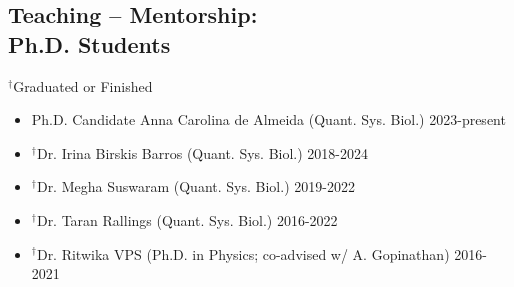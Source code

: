 \documentclass[margin,line,12pt]{res}
\begin{document}
\begin{resume}
\section{\sc Teaching -- Mentorship: \\ Ph.D. Students}
{\footnotesize{${}^\dag$Graduated or Finished}}
\begin{itemize}
  \item Ph.D. Candidate Anna Carolina de Almeida (Quant. Sys. Biol.) \hfill 2023-present
  \item ${}^\dag$Dr. Irina Birskis Barros (Quant. Sys. Biol.) \hfill 2018-2024
  \item ${}^\dag$Dr. Megha Suswaram (Quant. Sys. Biol.) \hfill 2019-2022
  \item ${}^\dag$Dr. Taran Rallings (Quant. Sys. Biol.) \hfill 2016-2022
  \item ${}^\dag$Dr. Ritwika VPS (Ph.D. in Physics; co-advised w/ A. Gopinathan) \hfill 2016-2021


\end{itemize}



\end{resume}
\end{document}
